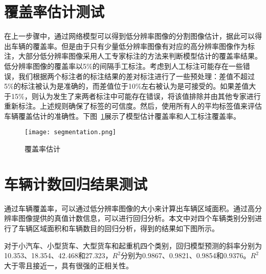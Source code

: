\section{覆盖率估计测试}
在上一步骤中，通过网络模型可以得到低分辨率图像的分割图像估计，据此可以得出车辆的覆盖率。但是由于只有少量低分辨率图像有对应的高分辨率图像作为标注，大部分低分辨率图像采用人工专家标注的方法来判断模型估计的覆盖率结果。低分辨率图像的覆盖率以5\%的间隔手工标注。考虑到人工标注可能存在一些错误，我们根据两个标注者的标注结果的差对标注进行了一些预处理：差值不超过5\%的标注被认为是准确的，而差值位于10\%左右被认为是可接受的。如果差值大于15\%，则认为发生了来两者标注中可能存在错误，将该值排除并由其他专家进行重新标注。上述规则确保了标签的可信度。然后，使用所有人的平均标签值来评估车辆覆盖估计的准确性。下图~\ref{fig:seg}展示了模型估计覆盖率和人工标注覆盖率。
\begin{figure}[h]
    \centering
    \texttt{[image: segmentation.png]}
    \caption{覆盖率估计}
    \label{fig:seg}
\end{figure}

\section{车辆计数回归结果测试}
通过车辆覆盖率，可以通过低分辨率图像的大小来计算出车辆区域面积。通过高分辨率图像提供的真值计数信息，可以进行回归分析。本文中对四个车辆类别分别进行了车辆区域面积和车辆数目的回归分析，得到的结果如下图所示。

  对于小汽车、小型货车、大型货车和起重机四个类别，回归模型预测的斜率分别为10.353、18.354、42.468和27.323，\(R^2\)分别为0.9867、0.9821、0.9854和0.9376。\(R^2\)大于零且接近一，具有很强的正相关性。


